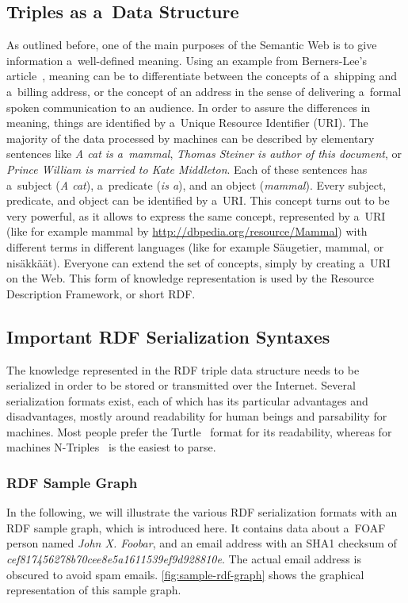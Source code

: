 \subsection{Triples as a~Data Structure}
As outlined before, one of the main purposes of the Semantic Web is to give information
a~well-defined meaning.
Using an example from Berners-Lee's article~\cite{BernersLee2001},
meaning can be to differentiate between the concepts of a~shipping and a~billing address,
or the concept of an address in the sense of delivering a~formal spoken communication to an audience.
In order to assure the differences in meaning,
things are identified by a~Unique Resource Identifier (URI).
The majority of the data processed by machines can be described by elementary sentences like
\emph{A cat is a~mammal}, \emph{Thomas Steiner is author of this document}, or
\emph{Prince William is married to Kate Middleton}.
Each of these sentences has a~subject (\emph{A cat}), a~predicate (\emph{is a}),
and an object (\emph{mammal}).
Every subject, predicate, and object can be identified by a~URI.
This concept turns out to be very powerful, as it allows to express the same concept,
represented by a~URI (like for example mammal by \url{http://dbpedia.org/resource/Mammal})
with different terms in different languages (like for example Säugetier, mammal, or nisäkkäät). 
Everyone can extend the set of concepts, simply by creating a~URI on the Web.
This form of knowledge representation is used by the Resource Description Framework, or short RDF.

\subsection{Important RDF Serialization Syntaxes}
The knowledge represented in the RDF triple data structure needs to be serialized
in order to be stored or transmitted over the Internet.
Several serialization formats exist, each of which has its particular advantages
and disadvantages, mostly around readability for human beings and parsability for machines.
Most people prefer the Turtle~\cite{Prudhommeaux2011} format for its readability,
whereas for machines N-Triples~\cite{Grant2004} is the easiest to parse.

\subsubsection{RDF Sample Graph}
In the following, we will illustrate the various RDF serialization formats
with an RDF sample graph, which is introduced here.
It contains data about a~FOAF~\cite{Brickley2010} person named \emph{John X. Foobar},
and an email address with an SHA1 checksum of \emph{cef817456278b70cee8e5a1611539\-ef9d928810e}.
The actual email address is obscured to avoid spam emails.
\autoref{fig:sample-rdf-graph} shows the graphical representation of this sample graph.

